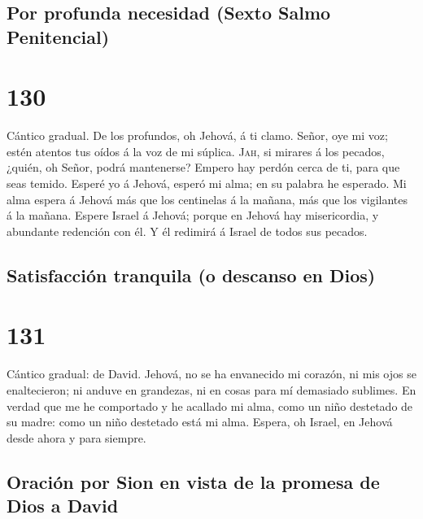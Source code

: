 \hypertarget{por-profunda-necesidad-sexto-salmo-penitencial}{%
\subsection{Por profunda necesidad (Sexto Salmo
Penitencial)}\label{por-profunda-necesidad-sexto-salmo-penitencial}}

\hypertarget{section-129}{%
\section{130}\label{section-129}}

 Cántico gradual. De los profundos, oh Jehová, á ti clamo.
 Señor, oye mi voz; estén atentos tus oídos á la voz de mi
súplica.  \textsc{Jah}, si mirares á los pecados, ¿quién,
oh Señor, podrá mantenerse?  Empero hay perdón cerca de
ti, para que seas temido.  Esperé yo á Jehová, esperó mi
alma; en su palabra he esperado.  Mi alma espera á Jehová
más que los centinelas á la mañana, más que los vigilantes á la mañana.
 Espere Israel á Jehová; porque en Jehová hay
misericordia, y abundante redención con él.  Y él redimirá
á Israel de todos sus pecados.

\hypertarget{satisfacciuxf3n-tranquila-o-descanso-en-dios}{%
\subsection{Satisfacción tranquila (o descanso en
Dios)}\label{satisfacciuxf3n-tranquila-o-descanso-en-dios}}

\hypertarget{section-130}{%
\section{131}\label{section-130}}

 Cántico gradual: de David. Jehová, no se ha envanecido mi
corazón, ni mis ojos se enaltecieron; ni anduve en grandezas, ni en
cosas para mí demasiado sublimes.  En verdad que me he
comportado y he acallado mi alma, como un niño destetado de su madre:
como un niño destetado está mi alma.  Espera, oh Israel,
en Jehová desde ahora y para siempre.

\hypertarget{oraciuxf3n-por-sion-en-vista-de-la-promesa-de-dios-a-david}{%
\subsection{Oración por Sion en vista de la promesa de Dios a
David}\label{oraciuxf3n-por-sion-en-vista-de-la-promesa-de-dios-a-david}}

